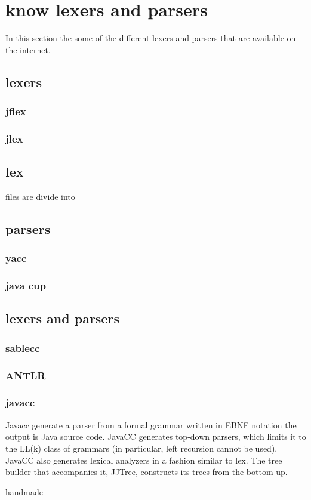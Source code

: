 \section{know lexers and parsers}
In this section the some of the different lexers and parsers that are available on the internet.

\subsection{lexers}

\subsubsection{jflex}

\subsubsection{jlex}

\subsection{lex}
files are divide into
\subsection{parsers}

\subsubsection{yacc}

\subsubsection{java cup}

\subsection{lexers and parsers}

\subsubsection{sablecc}

\subsubsection{ANTLR}

\subsubsection{javacc}
Javacc generate a parser from a formal grammar written in EBNF notation the output is Java source code. JavaCC generates top-down parsers, which limits it to the LL(k) class of grammars (in particular, left recursion cannot be used). JavaCC also generates lexical analyzers in a fashion similar to lex. The tree builder that accompanies it, JJTree, constructs its trees from the bottom up.







handmade
